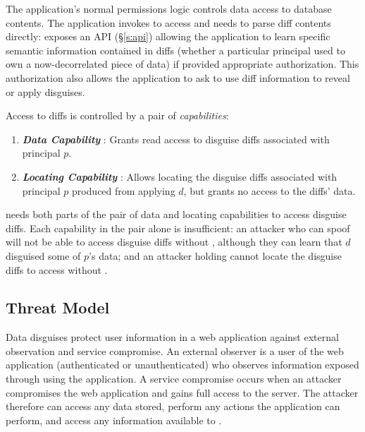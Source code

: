 The application's normal permissions logic controls data access to database contents. The
application invokes \sys to access and needs to parse diff contents directly: \sys exposes an API
(\S\ref{s:api}) allowing the application to learn specific semantic information contained in diffs
(\eg whether a particular principal used to own a now-decorrelated piece of data) if provided
appropriate authorization. This authorization also allows the application to ask \sys to use diff
information to reveal or apply disguises.

\vspace{6pt}\noindent
Access to diffs is controlled by a pair of \emph{capabilities}:
\begin{enumerate}
    \item \emph{\textbf{Data Capability }}: Grants read access to disguise diffs 
        associated with principal $p$.
    \item \emph{\textbf{Locating Capability }}: Allows locating the disguise
        diffs associated with principal $p$ produced from applying $d$, but grants no 
        access to the diffs' data.
\end{enumerate}

\noindent \sys needs both parts of the pair of data and locating capabilities  to access
disguise diffs.  Each capability in the pair alone is insufficient: an attacker who can spoof
 will not be able to access disguise diffs without , although they can learn
that $d$ disguised some of $p$'s data; and an attacker holding  cannot locate the disguise
diffs to access without .

\subsection{Threat Model}
\label{s:threat}

%
Data disguises protect user information in a web application against external observation
and service compromise.
%
An external observer is a user of the web application (authenticated or unauthenticated) who
observes information exposed through using the application.
%
A service compromise occurs when an attacker compromises the web application and 
gains full access to the server.
%
The attacker therefore can access any data stored, perform any actions the application can
perform, and access any information available to \sys.
%

